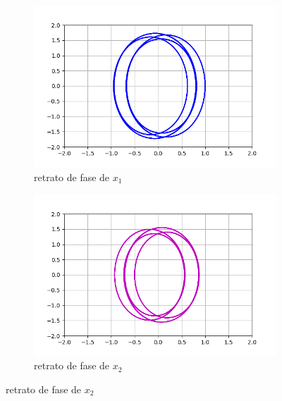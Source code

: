 \documentclass{article}
\begin{document}
\begin{figure}[ht!]
	\begin{subfigure}[b]{0.5\linewidth}
    \raggedleft
	\includegraphics[width=\linewidth]{ejercicio31-phase-x1.png}
    \caption{retrato de fase de $x_1$}
	\end{subfigure}
	\begin{subfigure}[b]{0.5\linewidth}
    \raggedright
	\includegraphics[width=\linewidth]{ejercicio31-phase-x2.png}
	\caption{retrato de fase de $x_2$}
    \end{subfigure}
\end{figure}
\end{document}
